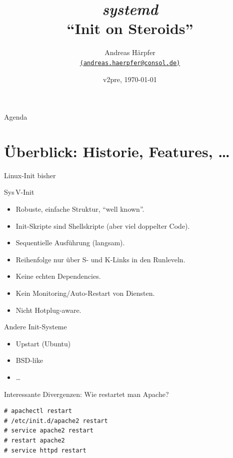 
\title[systemd]{\emph{\huge systemd}\\[1ex] ``Init on Steroids''}
\author[Andreas Härpfer]{Andreas Härpfer \\
  {\scriptsize \href{mailto:andreas.haerpfer@consol.de}
   {\nolinkurl{(andreas.haerpfer@consol.de)}}}}
\date{v2pre, \today}

\subject{systemd}






\begin{frame}[plain]
\titlepage
\end{frame}

\begin{frame}{Agenda}
\tableofcontents
\end{frame}

\section[Überblick]{Überblick: Historie, Features, \dots}

\begin{frame}{Linux-Init bisher}
\begin{block}{Sys\,V-Init}
\begin{itemize}
\item Robuste, einfache Struktur, "`well known"'.
\item Init-Skripte sind Shellskripte (aber viel doppelter Code).
\item Sequentielle Ausführung (langsam).
\item Reihenfolge nur über S- und K-Links in den Runleveln.
\item Keine echten Dependencies.
\item Kein Monitoring/Auto-Restart von Diensten.
\item Nicht Hotplug-aware.
\end{itemize}
\end{block}

\begin{block}{Andere Init-Systeme}
\begin{itemize}
\item Upstart (Ubuntu)
\item BSD-like
\item \dots
\end{itemize}
\end{block}

\framebreak
Interessante Divergenzen: Wie restartet man Apache?

\begin{lstlisting}[style=numbered]
# apachectl restart
# /etc/init.d/apache2 restart
# service apache2 restart
# restart apache2
# service httpd restart
\end{lstlisting}
\end{frame}


